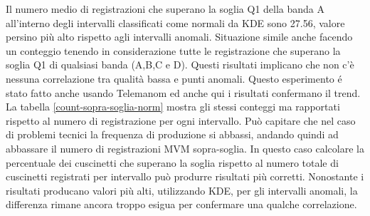 Il numero medio di registrazioni che superano la soglia Q1 della banda A all'interno degli intervalli classificati come normali da KDE sono 27.56, valore persino più alto rispetto agli intervalli anomali. Situazione simile anche facendo un conteggio tenendo in considerazione tutte le registrazione che superano la soglia Q1 di qualsiasi banda (A,B,C e D). Questi risultati implicano che non c'è nessuna correlazione tra qualità bassa e punti anomali. 
Questo esperimento é stato fatto anche usando Telemanom ed anche qui i risultati confermano il trend.
La tabella \ref{count-sopra-soglia-norm} mostra gli stessi conteggi ma rapportati rispetto al numero di registrazione per ogni intervallo. Può capitare che nel caso di problemi tecnici la frequenza di produzione si abbassi, andando quindi ad abbassare il numero di registrazioni MVM sopra-soglia. In questo caso calcolare la percentuale dei cuscinetti che superano la soglia rispetto al numero totale di cuscinetti registrati per intervallo può produrre risultati più corretti. 
Nonostante i risultati producano valori più alti, utilizzando KDE, per gli intervalli anomali, la differenza rimane ancora troppo esigua per confermare una qualche correlazione. 

\begin{table}[ht]
\centering
{}
\caption{\label{count-sopra-soglia}Numero medio di cuscinetti sopra-soglia per intervallo}
\end{table}

